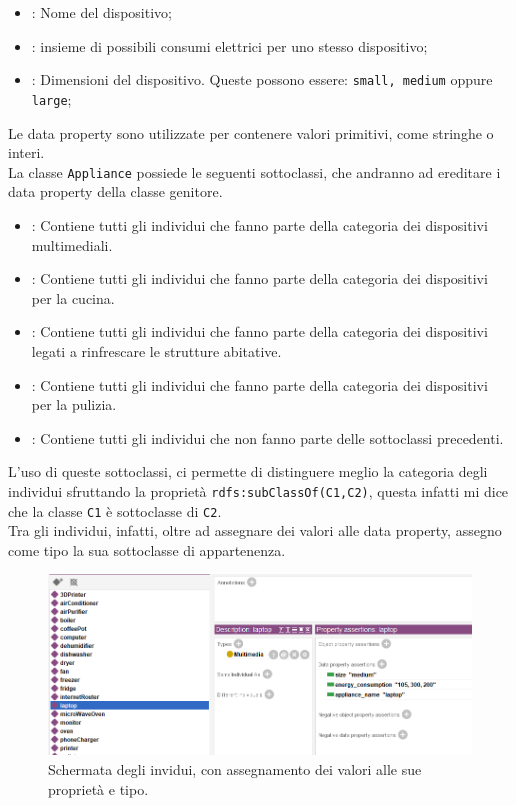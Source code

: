 \documentclass[12pt, letterpaper]{article}
\begin{document}
\begin{itemize}
      \item {}: Nome del dispositivo;
      \item {}: insieme di possibili consumi elettrici per uno stesso
            dispositivo;
      \item {}: Dimensioni del dispositivo. Queste possono
            essere: \texttt{small, medium} oppure \texttt{large};
\end{itemize}

\noindent Le data property sono utilizzate per contenere valori primitivi, come stringhe o interi. \\

\noindent La classe \texttt{Appliance} possiede le seguenti sottoclassi, che andranno ad ereditare i
data property della classe genitore.

\begin{itemize}
      \item {}: Contiene tutti gli individui che fanno parte della categoria dei dispositivi multimediali.
      \item {}: Contiene tutti gli individui che fanno parte della categoria dei dispositivi per la cucina.
      \item {}: Contiene tutti gli individui che fanno parte della categoria dei dispositivi legati a rinfrescare
            le strutture abitative.
      \item {}: Contiene tutti gli individui che fanno parte della categoria dei dispositivi per la pulizia.
      \item {}: Contiene tutti gli individui che non fanno parte delle sottoclassi precedenti.
\end{itemize}

\noindent L'uso di queste sottoclassi, ci permette di distinguere meglio la categoria degli individui sfruttando
la proprietà \texttt{rdfs:subClassOf(C1,C2)}, questa infatti mi dice che la
classe \texttt{C1} è sottoclasse di \texttt{C2}. \\

\noindent Tra gli individui, infatti, oltre ad assegnare dei valori alle data property, assegno come tipo la sua
sottoclasse di appartenenza.

\begin{figure}[h]
      \centering
      \includegraphics[scale=0.6]{individui-protege.png}
      \caption{Schermata degli invidui, con assegnamento dei valori alle sue proprietà e tipo.}
\end{figure}
\end{document}
